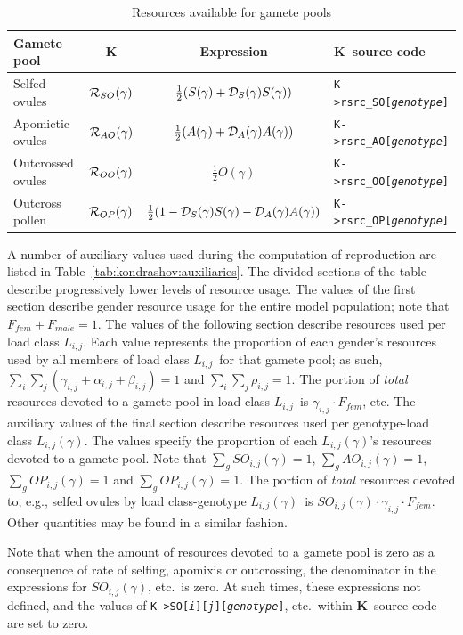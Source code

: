 \documentclass[10pt,twoside,a4paper,fleqn]{report}
\numberwithin{equation}{section}  %
\newcommand{\K}{{\bf K}}
\newcommand{\Kmemberi}[2]{\mbox{{\tt K->#1[{\it #2}\/]}}}
\newcommand{\Kmemberijk}[4]{\mbox{{\tt K->#1[{\it #2}\/][{\it #3}\/][{\it #4}\/]}}}
\newcommand{\Lij}{\mbox{$L_{i,j}$}}              %
\newcommand{\Lgij}{\mbox{$L_{i,j}(\gamma)$}}     %
\newcommand{\Sg}{\mbox{$S(\gamma)$}}
\newcommand{\DSg}{\mbox{${\cal D}_{S}(\gamma)$}}
\newcommand{\Ag}{\mbox{$A(\gamma)$}}
\newcommand{\DAg}{\mbox{${\cal D}_{A}(\gamma)$}}
\newcommand{\Og}{\mbox{$O(\gamma)$}}
\newcommand{\RSOg}{\mbox{${\cal R}_{SO}(\gamma)$}}
\newcommand{\RAOg}{\mbox{${\cal R}_{AO}(\gamma)$}}
\newcommand{\ROOg}{\mbox{${\cal R}_{OO}(\gamma)$}}
\newcommand{\ROPg}{\mbox{${\cal R}_{OP}(\gamma)$}}
\newcommand{\Ffemale}{\mbox{$F_{fem}$}}
\newcommand{\Fmale}{\mbox{$F_{male}$}}
\newcommand{\betaij}{\mbox{$\beta_{i,j}$}}
\newcommand{\gammaij}{\mbox{$\gamma_{i,j}$}}
\newcommand{\alphaij}{\mbox{$\alpha_{i,j}$}}
\newcommand{\rhoij}{\mbox{$\rho_{i,j}$}}
\newcommand{\SOijg}{\mbox{$SO_{i,j}(\gamma)$}}
\newcommand{\AOijg}{\mbox{$AO_{i,j}(\gamma)$}}
\newcommand{\OPijg}{\mbox{$OP_{i,j}(\gamma)$}}
\begin{document}
{%
\begin{table}
	\begin{center}
	  {\small
		\begin{tabular}{@{}l|c|c|l@{}}
Gamete pool 			&	\K	                 & Expression    & \K\ source code \\
\hline %
\hline %
Selfed ovules			&	\RSOg & $\frac{1}{2}(\Sg+\DSg\Sg)$ & \Kmemberi{rsrc\_SO}{genotype} \\
Apomictic ovules	&	\RAOg & $\frac{1}{2}(\Ag+\DAg\Ag)$ & \Kmemberi{rsrc\_AO}{genotype} \\
Outcrossed ovules	&	\ROOg & $\frac{1}{2}\Og$ 					 & \Kmemberi{rsrc\_OO}{genotype} \\
Outcross pollen		&	\ROPg & $\frac{1}{2}(1-\DSg\Sg-\DAg\Ag)$ & \Kmemberi{rsrc\_OP}{genotype} \\
		\end{tabular}
		}
	\end{center}
	\caption{Resources available for gamete pools}
	\label{tab:kondrashov:matingresources}
\end{table}

A number of auxiliary values used during the computation of reproduction are listed in Table~\ref{tab:kondrashov:auxiliaries}.  The divided sections of the table describe progressively lower levels of resource usage.  The values of the first section describe gender resource usage for the entire model population; note that $\Ffemale+\Fmale=1$.  The values of the following section describe resources used per load class \Lij.  Each value represents the proportion of each gender's resources used by all members of load class \Lij\ for that gamete pool; as such, $\sum_{i}{\sum_{j}{(\gammaij+\alphaij+\betaij)}}=1$ and $\sum_{i}{\sum_{j}{\rhoij}}=1$.  The portion of {\em total} resources devoted to a gamete pool in load class \Lij\ is $\gammaij\cdot\Ffemale$, etc.  The auxiliary values of the final section describe resources used per genotype-load class \Lgij.  The values specify the proportion of each \Lgij's resources devoted to a gamete pool.  Note that $\sum_{g}{\SOijg}=1$, $\sum_{g}{\AOijg}=1$, $\sum_{g}{\OPijg}=1$ and $\sum_{g}{\OPijg}=1$.  The portion of {\em total} resources devoted to, e.g., selfed ovules by load class-genotype \Lgij\ is $\SOijg\cdot\gammaij\cdot\Ffemale$.  Other quantities may be found in a similar fashion.

Note that when the amount of resources devoted to a gamete pool is zero as a consequence of rate of selfing, apomixis or outcrossing, the denominator in the expressions for \SOijg, etc.\ is zero.  At such times, these expressions not defined, and the values of \Kmemberijk{SO}{i}{j}{genotype}, etc.\ within \K\ source code are set to zero.

}
\end{document}
